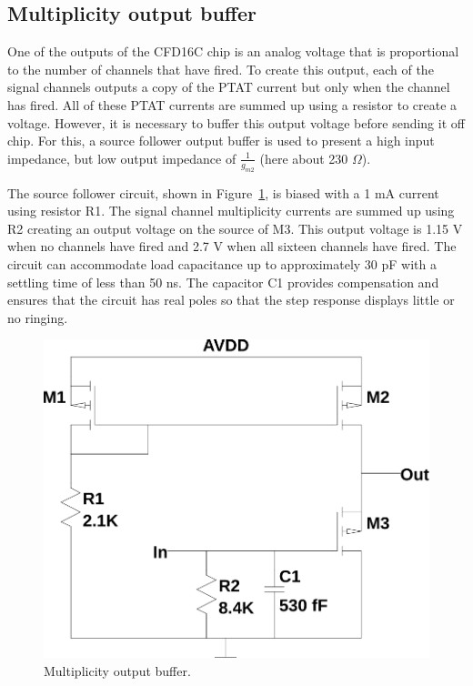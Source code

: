 \documentclass[12pt,oneside,final]{siuethesis}
\theoremstyle{definition}
\begin{document}
\subsection{Multiplicity output buffer}
\par One of the outputs of the CFD16C chip is an analog voltage that is proportional to the number of channels that have fired. To create this output, each of the signal channels outputs a copy of the PTAT current but only when the channel has fired. All of these PTAT currents are summed up using a resistor to create a voltage. However, it is necessary to buffer this output voltage before sending it off chip. For this, a source follower output buffer is used to present a high input impedance, but low output impedance of $\frac{1}{g_{m2}}$ (here about 230 $\Omega$). 
\par The source follower circuit, shown in Figure~\ref{fig:mult}, is biased with a 1 mA current using resistor R1. The signal channel multiplicity currents are summed up using R2 creating an output voltage on the source of M3. This output voltage is 1.15 V when no channels have fired and 2.7 V when all sixteen channels have fired. The circuit can accommodate load capacitance up to approximately 30 pF with a settling time of less than 50 ns.  The capacitor C1 provides compensation and ensures that the circuit has real poles so that the step response displays little or no ringing.

\begin{figure}[htbp!]
\centering
\includegraphics[scale=.45,keepaspectratio=true]{../LTspice_Drawings/multiplicity/mult_buffer.png} 
\caption{Multiplicity output buffer.}
\label{fig:mult}
\end{figure}
\end{document}
